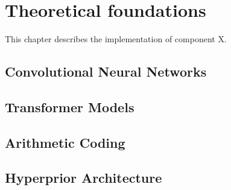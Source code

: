 \chapter{Theoretical foundations\label{cha:chapter3}}

This chapter describes the implementation of component X.

\section{Convolutional Neural Networks}

\section{Transformer Models}

\section{Arithmetic Coding}

\section{Hyperprior Architecture}